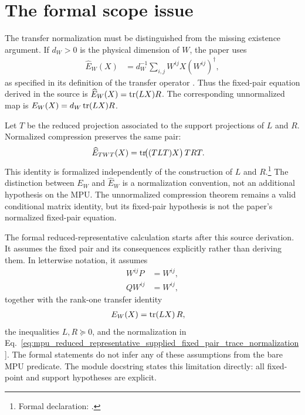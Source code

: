 \documentclass{article}
\begin{document}
\section{The formal scope issue}

The transfer normalization must be distinguished from the missing existence
argument. If $d_W>0$ is the physical dimension of $W$, the paper uses
\begin{align}
    \widehat E_W(X) &= d_W^{-1}\sum_{i,j}W^{ij}X(W^{ij})^\dagger,
    \label{eq:mpu_fixed_pair_normalized_transfer}
\end{align}
as specified in its definition of the transfer operator
\cite[lines~336--340]{Cirac2017MPU}. Thus the fixed-pair equation derived
in the source is $\widehat E_W(X)=\operatorname{tr}(LX)R$. The corresponding
unnormalized map is $E_W(X)=d_W\operatorname{tr}(LX)R$.

Let $T$ be the reduced projection associated to the support projections of
$L$ and $R$. Normalized compression preserves the same pair:
\begin{align}
    \widehat E_{TWT}(X) &=\operatorname{tr}\!\bigl((TLT)X\bigr)\,TRT.
    \label{eq:mpu_fixed_pair_normalized_compression}
\end{align}
This identity is formalized independently of the construction of $L$ and
$R$.\footnote{Formal declaration:
.}
The distinction between $E_W$ and $\widehat E_W$ is a normalization
convention, not an additional hypothesis on the MPU. The unnormalized
compression theorem remains a valid conditional matrix identity, but its
fixed-pair hypothesis is not the paper's normalized fixed-pair equation.

The formal reduced-representative calculation starts after this source
derivation. It assumes the fixed pair and its consequences explicitly rather
than deriving them. In letterwise notation, it assumes
\begin{align}
    W^{ij}P
        &=W^{ij},
    \label{eq:mpu_reduced_representative_supplied_fixed_pair_letterwise_right_absorption}\\
    QW^{ij}
        &=W^{ij},
    \label{eq:mpu_reduced_representative_supplied_fixed_pair_letterwise_left_absorption}
\end{align}
together with the rank-one transfer identity
\begin{align}
    E_W(X) &= \operatorname{tr}(LX)\,R,
    \label{eq:mpu_reduced_representative_supplied_fixed_pair_assumed_transfer}
\end{align}
the inequalities $L,R\succeq0$, and the normalization in
Eq.~\ref{eq:mpu_reduced_representative_supplied_fixed_pair_trace_normalization}.
The formal statements do not infer any of these assumptions from the bare MPU
predicate. The module docstring states this limitation directly: all
fixed-point and support hypotheses are explicit.
\end{document}

